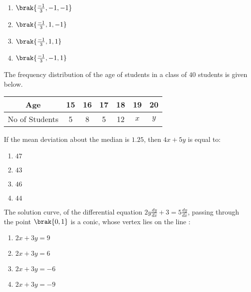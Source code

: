      \begin{enumerate}
	\item $\brak{\frac{-1}{3},-1,-1}$
	\item $\brak{\frac{-1}{3},1,-1}$
	\item $\brak{\frac{-1}{3},1,1}$ 
	\item $\brak{\frac{-1}{3},-1,1}$ 
     \end{enumerate}
\item The frequency distribution of the age of students in a class of $40$ students is given below. \hfill{}
\begin{table}[h]
\centering
\begin{tabular}{|c|c|c|c|c|c|c|}
\hline
Age           & 15  & 16  & 17  & 18  & 19  & 20  \\ \hline
No of Students & 5   & 8   & 5   & 12  & $x$ & $y$ \\ \hline
\end{tabular}
\end{table}
If the mean deviation about the median is $1.25$, then $4x+5y$ is equal to:
     \begin{enumerate}
     \item $47$ \item $43$ \item $46$ \item $44$
     \end{enumerate}
\item The solution curve, of the differential equation $2y \frac{dy}{dx} +3=5\frac{dy}{dx}$, passing through the point $\brak{0,1}$ is a conic, whose vertex lies on the line : \hfill{}
	\begin{enumerate}
     \item $2x+3y=9$ \item $2x+3y=6$ \item $2x+3y=-6$ \item $2x+3y=-9$ 
     \end{enumerate}

 

 
